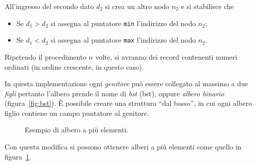 All'ingresso del secondo dato $d_2$ si crea un altro nodo $n_2$ e si stabilisce che
\begin{itemize}
	\item
Se $d_1>d_2$ si assegna al puntatore \lstinline!min! l'indirizzo del nodo $n_2$;
	\item
Se $d_1<d_2$ si assegna al puntatore \lstinline!max! l'indirizzo del nodo $n_2$.
\end{itemize}
Ripetendo il procedimento $n$ volte, si avranno dei record contenenti numeri ordinati (in ordine crescente, in questo caso).


In questa implementazione ogni \emph{genitore} può essere collegato al massimo a due \emph{figli} pertanto l'albero prende il nome di \emph{\acl{bst}} {\small(\acs{bst})}, oppure \emph{albero binario} (figura~\ref{fig:bst}).
\`E possibile creare una struttura ``dal basso'', in cui ogni albero figlio contiene un campo puntatore al genitore.
\begin{figure}
	\centering

	\caption{Esempio di albero a più elementi.}
	\label{fig:+el-tree}
\end{figure}
Con questa modifica si possono ottenere alberi a più elementi come quello in figura~\ref{fig:+el-tree}.



